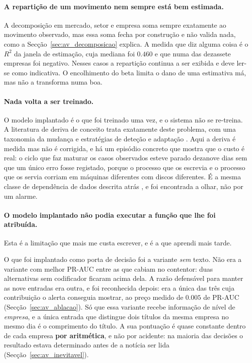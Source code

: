 \paragraph{A repartição de um movimento nem sempre está bem estimada.}
A decomposição em mercado, setor e empresa soma sempre exatamente ao movimento observado, mas essa
soma fecha por construção e não valida nada, como a Secção~\ref{sec:av_decomposicao} explica. A
medida que diz alguma coisa é o $R^2$ da janela de estimação, cuja mediana foi $0.460$ e que numa
das dezassete empresas foi negativo. Nesses casos a repartição continua a ser exibida e deve
ler-se como indicativa. O encolhimento do beta \autocite{vasicek1973beta} limita o dano de uma
estimativa má, mas não a transforma numa boa.

\paragraph{Nada volta a ser treinado.}
O modelo implantado é o que foi treinado uma vez, e o sistema não se re-treina. A literatura de
deriva de conceito trata exatamente deste problema, com uma taxonomia da mudança e estratégias de
deteção e adaptação \autocite{gama2014survey}. Aqui a deriva é medida mas não é corrigida, e há um
episódio concreto que mostra que o custo é real: o ciclo que faz maturar os casos observados esteve
parado dezanove dias sem que um único erro fosse registado, porque o processo que os escrevia e o
processo que os servia corriam em máquinas diferentes com discos diferentes. É a mesma classe de
dependência de dados descrita atrás \autocite{sculley2015debt}, e foi encontrada a olhar, não
por um alarme.

\paragraph{O modelo implantado não podia executar a função que lhe foi atribuída.}
Esta é a limitação que mais me custa escrever, e é a que aprendi mais tarde.

O que foi implantado como porta de decisão foi a variante \emph{sem} texto. Não era a variante com
melhor PR-AUC entre as que cabiam no contentor: duas alternativas sem codificador ficaram acima
dela. A razão defensável para manter as nove entradas era outra, e foi reconhecida depois: era a
única das três cuja contribuição o alerta conseguia mostrar, ao preço medido de $0.005$ de PR-AUC
(Secção~\ref{sec:av_ablacao}). Só que essa variante recebe informação de nível de \emph{empresa}, e
a única entrada que distingue dois títulos da mesma empresa no mesmo dia é o comprimento do título.
A sua pontuação é quase constante dentro de cada empresa \textbf{por aritmética}, e não por
acidente: na maioria das decisões o resultado estava determinado antes de a notícia ser lida
(Secção~\ref{sec:av_inevitavel}).

